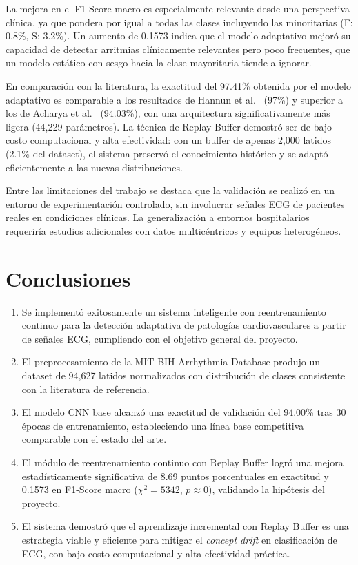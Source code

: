 \documentclass[11pt,spanish]{citedi}
\begin{document}
La mejora en el F1-Score macro es especialmente relevante desde una perspectiva clínica, ya que pondera por igual a todas las clases incluyendo las minoritarias (F: 0.8\%, S: 3.2\%). Un aumento de 0.1573 indica que el modelo adaptativo mejoró su capacidad de detectar arritmias clínicamente relevantes pero poco frecuentes, que un modelo estático con sesgo hacia la clase mayoritaria tiende a ignorar.

En comparación con la literatura, la exactitud del 97.41\% obtenida por el modelo adaptativo es comparable a los resultados de Hannun et al.\ \cite{Hannun2019} (97\%) y superior a los de Acharya et al.\ \cite{Acharya2017} (94.03\%), con una arquitectura significativamente más ligera (44,229 parámetros). La técnica de Replay Buffer demostró ser de bajo costo computacional y alta efectividad: con un buffer de apenas 2,000 latidos (2.1\% del dataset), el sistema preservó el conocimiento histórico y se adaptó eficientemente a las nuevas distribuciones.

Entre las limitaciones del trabajo se destaca que la validación se realizó en un entorno de experimentación controlado, sin involucrar señales ECG de pacientes reales en condiciones clínicas. La generalización a entornos hospitalarios requeriría estudios adicionales con datos multicéntricos y equipos heterogéneos.

\section{Conclusiones}

\begin{enumerate}
\item Se implementó exitosamente un sistema inteligente con reentrenamiento continuo para la detección adaptativa de patologías cardiovasculares a partir de señales ECG, cumpliendo con el objetivo general del proyecto.

\item El preprocesamiento de la MIT-BIH Arrhythmia Database produjo un dataset de 94,627 latidos normalizados con distribución de clases consistente con la literatura de referencia.

\item El modelo CNN base alcanzó una exactitud de validación del 94.00\% tras 30 épocas de entrenamiento, estableciendo una línea base competitiva comparable con el estado del arte.

\item El módulo de reentrenamiento continuo con Replay Buffer logró una mejora estadísticamente significativa de 8.69 puntos porcentuales en exactitud y 0.1573 en F1-Score macro ($\chi^2 = 5342$, $p \approx 0$), validando la hipótesis del proyecto.

\item El sistema demostró que el aprendizaje incremental con Replay Buffer es una estrategia viable y eficiente para mitigar el \textit{concept drift} en clasificación de ECG, con bajo costo computacional y alta efectividad práctica.
\end{enumerate}
\end{document}
